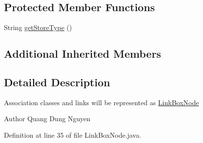 \subsection*{Protected Member Functions}
\begin{DoxyCompactItemize}
\item 
String \hyperlink{classorg_1_1tzi_1_1use_1_1gui_1_1views_1_1diagrams_1_1behavior_1_1communicationdiagram_1_1_link_box_node_afb21ffcdc5a1bfe0fbcced677127dab9}{get\-Store\-Type} ()
\end{DoxyCompactItemize}
\subsection*{Additional Inherited Members}


\subsection{Detailed Description}
Association classes and links will be represented as \hyperlink{classorg_1_1tzi_1_1use_1_1gui_1_1views_1_1diagrams_1_1behavior_1_1communicationdiagram_1_1_link_box_node}{Link\-Box\-Node}

\begin{DoxyAuthor}{Author}
Quang Dung Nguyen 
\end{DoxyAuthor}


Definition at line 35 of file Link\-Box\-Node.\-java.



